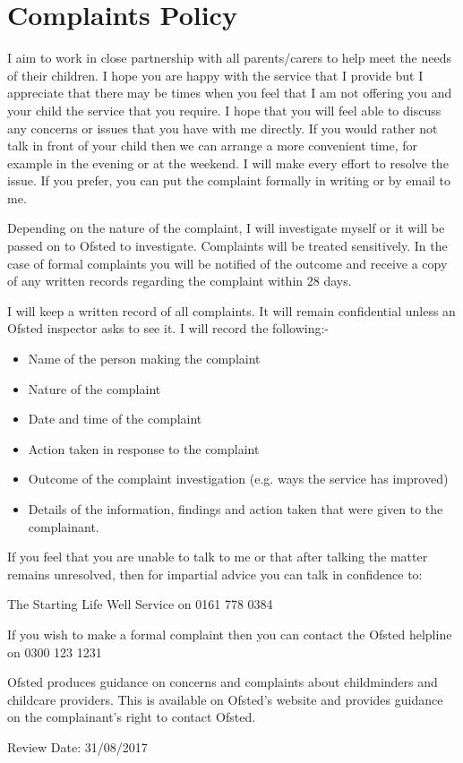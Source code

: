 

\section{Complaints Policy}

I aim to work in close partnership with all parents/carers to help meet
the needs of their children. I hope you are happy with the service that
I provide but I appreciate that there may be times when you feel that I
am not offering you and your child the service that you require. I hope
that you will feel able to discuss any concerns or issues that you have
with me directly. If you would rather not talk in front of your child
then we can arrange a more convenient time, for example in the evening
or at the weekend. I will make every effort to resolve the issue. If you
prefer, you can put the complaint formally in writing or by email to me.

Depending on the nature of the complaint, I will investigate myself or
it will be passed on to Ofsted to investigate. Complaints will be
treated sensitively. In the case of formal complaints you will be
notified of the outcome and receive a copy of any written records
regarding the complaint within 28 days.

I will keep a written record of all complaints. It will remain
confidential unless an Ofsted inspector asks to see it. I will record
the following:-

\begin{itemize}
\item
  Name of the person making the complaint~
\item
  Nature of the complaint~
\item
  Date and time of the complaint~
\item
  Action taken in response to the complaint~
\item
  Outcome of the complaint investigation (e.g. ways the service has
  improved)~
\item
  Details of the information, findings and action taken that were given
  to the complainant. ~
\end{itemize}

If you feel that you are unable to talk to me or that after talking the
matter remains unresolved, then for impartial advice you can talk in
confidence to:

The Starting Life Well Service on 0161 778 0384

If you wish to make a formal complaint then you can contact the Ofsted
helpline on 0300 123 1231

Ofsted produces guidance on concerns and complaints about childminders
and childcare providers. This is available on Ofsted's website and
provides guidance on the complainant's right to contact Ofsted.

Review Date: 31/08/2017


